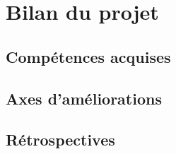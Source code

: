 \section{Bilan du projet}
\subsection{Compétences acquises}
\subsection{Axes d'améliorations}
\subsection{Rétrospectives}

